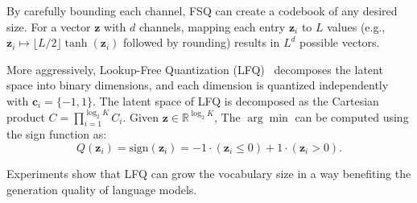 By carefully bounding each channel, FSQ can create a codebook of any desired size. 
For a vector \( \boldsymbol{z} \) with \( d \) channels, mapping each entry \( \boldsymbol{z}_i \) to \( L \) values (e.g., \( \boldsymbol{z}_i \mapsto \lfloor L/2 \rfloor \tanh(\boldsymbol{z}_i) \) followed by rounding) results in  \( L^d \) possible vectors.

More aggressively, Lookup-Free Quantization (LFQ)~\cite{yu2023magvit-v2} decomposes the latent space into binary dimensions, and each dimension is quantized independently with $\boldsymbol{c}_i = \{-1,1\}$. 
The latent space of LFQ is decomposed as the Cartesian product \( C = \prod_{i=1}^{\log_2 K} C_i \). Given \( \boldsymbol{z} \in \mathbb{R}^{\log_2 K} \),
The \( \arg \min \) can be computed using the sign function as:
\begin{equation}
Q(\boldsymbol{z}_i) = \text{sign}(\boldsymbol{z}_i) = -1 \cdot (\boldsymbol{z}_i \leq 0) + 1 \cdot (\boldsymbol{z}_i > 0).
\end{equation}


Experiments show that LFQ can grow the vocabulary size in a way
benefiting the generation quality of language models.







